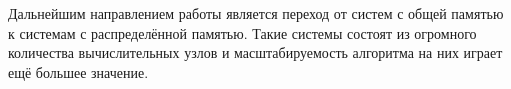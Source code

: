 \documentclass[a4paper,12pt]{extarticle}
\begin{document}
Дальнейшим направлением работы является переход от систем с общей памятью к системам с распределённой памятью.
Такие системы состоят из огромного количества вычислительных узлов и масштабируемость алгоритма на них играет ещё большее значение.









\newpage


\renewcommand\refname{Литература}

\end{document}
